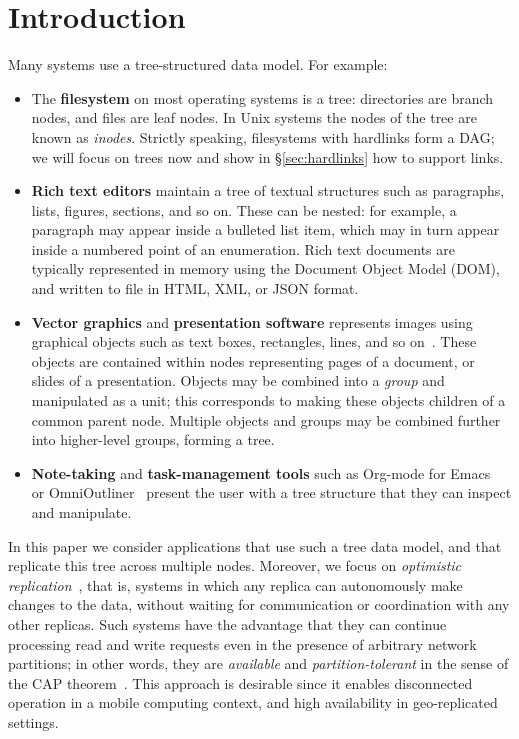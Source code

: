 \documentclass[sigplan,anonymous]{acmart}
\begin{document}
\maketitle

\section{Introduction}\label{sec:intro}

Many systems use a tree-structured data model.
For example:
\begin{itemize}
    \item The \textbf{filesystem} on most operating systems is a tree: directories are branch nodes, and files are leaf nodes.
        In Unix systems the nodes of the tree are known as \emph{inodes}.
        Strictly speaking, filesystems with hardlinks form a DAG; we will focus on trees now and show in \S\ref{sec:hardlinks} how to support links.
    \item \textbf{Rich text editors} maintain a tree of textual structures such as paragraphs, lists, figures, sections, and so on.
        These can be nested: for example, a paragraph may appear inside a bulleted list item, which may in turn appear inside a numbered point of an enumeration.
        Rich text documents are typically represented in memory using the Document Object Model (DOM), and written to file in HTML, XML, or JSON format.
    \item \textbf{Vector graphics} and \textbf{presentation software} represents images using graphical objects such as text boxes, rectangles, lines, and so on~\cite{Wallace:2019vf}.
        These objects are contained within nodes representing pages of a document, or slides of a presentation.
        Objects may be combined into a \emph{group} and manipulated as a unit; this corresponds to making these objects children of a common parent node.
        Multiple objects and groups may be combined further into higher-level groups, forming a tree.
    \item \textbf{Note-taking} and \textbf{task-management tools} such as Org-mode for Emacs~\cite{OrgMode} or OmniOutliner~\cite{OmniOutliner} present the user with a tree structure that they can inspect and manipulate.
\end{itemize}

In this paper we consider applications that use such a tree data model, and that replicate this tree across multiple nodes.
Moreover, we focus on \emph{optimistic replication}~\cite{Saito:2005jw}, that is, systems in which any replica can autonomously make changes to the data, without waiting for communication or coordination with any other replicas.
Such systems have the advantage that they can continue processing read and write requests even in the presence of arbitrary network partitions; in other words, they are \emph{available} and \emph{partition-tolerant} in the sense of the CAP theorem~\cite{Gilbert:2002il}.
This approach is desirable since it enables disconnected operation in a mobile computing context, and high availability in geo-replicated settings.
\end{document}
